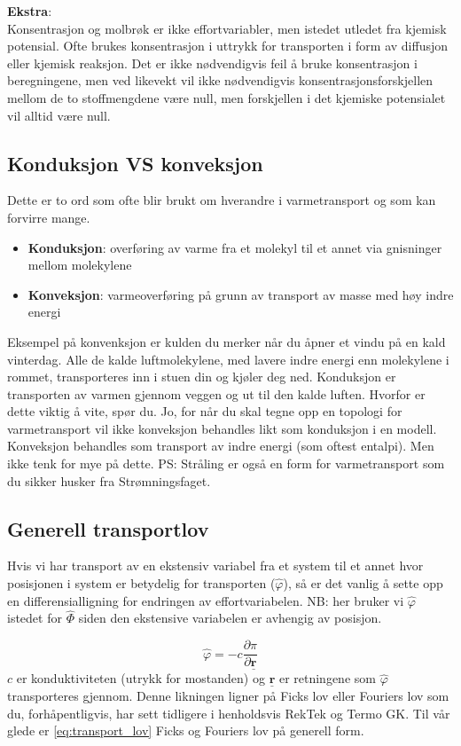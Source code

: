 \textbf{Ekstra}:\\ 
Konsentrasjon og molbrøk er ikke effortvariabler, men istedet utledet fra kjemisk potensial. Ofte brukes konsentrasjon i uttrykk for transporten i form av diffusjon eller kjemisk reaksjon. Det er ikke nødvendigvis feil å bruke konsentrasjon i beregningene, men ved likevekt vil ikke nødvendigvis konsentrasjonsforskjellen mellom de to stoffmengdene være null, men forskjellen i det kjemiske potensialet vil alltid være null.  

\subsection{Konduksjon VS konveksjon}\label{sec:konveksjon_konduksjon}
Dette er to ord som ofte blir brukt om hverandre i varmetransport og som kan forvirre mange. 

\begin{itemize}
    \item \textbf{Konduksjon}: overføring av varme fra et molekyl til et annet via gnisninger mellom molekylene
    \item \textbf{Konveksjon}: varmeoverføring på grunn av transport av masse med høy indre energi
\end{itemize}
Eksempel på konvenksjon er kulden du merker når du åpner et vindu på en kald vinterdag. Alle de kalde luftmolekylene, med lavere indre energi enn molekylene i rommet, transporteres inn i stuen din og kjøler deg ned. Konduksjon er transporten av varmen gjennom veggen og ut til den kalde luften. Hvorfor er dette viktig å vite, spør du. Jo, for når du skal tegne opp en topologi for varmetransport vil ikke konveksjon behandles likt som konduksjon i en modell. Konveksjon behandles som transport av indre energi (som oftest entalpi). Men ikke tenk for mye på dette. PS: Stråling er også en form for varmetransport som du sikker husker fra Strømningsfaget. 

\subsection{Generell transportlov}
Hvis vi har transport av en ekstensiv variabel fra et system til et annet hvor posisjonen i system er betydelig for transporten ($\hat{\varphi}$), så er det vanlig å sette opp en differensialligning for endringen av effortvariabelen. NB: her bruker vi $\hat{\varphi}$ istedet for $\hat{\Phi}$ siden den ekstensive variabelen er avhengig av posisjon.

\begin{equation}
    \label{eq:transport_lov}
    \hat{\varphi} = -c\frac{\partial \pi}{\partial \underline{\textbf{r}}}
\end{equation}
$c$ er konduktiviteten (utrykk for mostanden) og $\underline{\textbf{r}}$ er retningene som $\hat{\varphi}$ transporteres gjennom. Denne likningen ligner på Ficks lov eller Fouriers lov som du, forhåpentligvis, har sett tidligere i henholdsvis RekTek og Termo GK. Til vår glede er \cref{eq:transport_lov} Ficks og Fouriers lov på generell form. 

